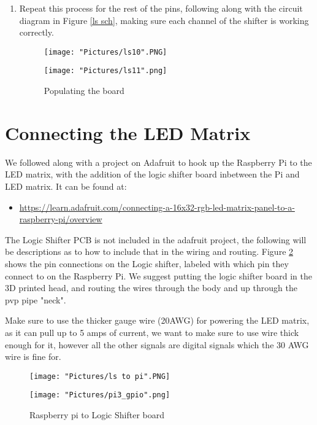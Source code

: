\documentclass[12pt]{article}
\begin{document}
\begin{enumerate}
	\item Repeat this process for the rest of the pins, following along with the circuit diagram in Figure \ref{ls sch}, making sure each channel of the shifter is working correctly. 

\begin{figure}[H]
 	\centering
  	\begin{minipage}[b]{0.45\textwidth}
		\texttt{[image: "Pictures/ls10".PNG]}
  	\end{minipage}
  	\hfill
  	\begin{minipage}[b]{0.45\textwidth}
    		\texttt{[image: "Pictures/ls11".png]}
  	\end{minipage}
	\caption{Populating the board}
	\label{ls2}
\end{figure}

\end{enumerate}

\section{Connecting the LED Matrix}
We followed along with a project on Adafruit to hook up the Raspberry Pi to the LED matrix, with the addition of the logic shifter board inbetween the Pi and LED matrix. It can be found at:

\begin{itemize}
	\item \href{https://learn.adafruit.com/connecting-a-16x32-rgb-led-matrix-panel-to-a-raspberry-pi/overview}{https://learn.adafruit.com/connecting-a-16x32-rgb-led-matrix-panel-to-a-raspberry-pi/overview}
\end{itemize}

\noindent The Logic Shifter PCB is not included in the adafruit project, the following will be descriptions as to how to include that in the wiring and routing. Figure \ref{ls2pi} shows the pin connections on the Logic shifter, labeled with which pin they connect to on the Raspberry Pi. We suggest putting the logic shifter board in the 3D printed head, and routing the wires through the body and up through the pvp pipe "neck". 

\noindent Make sure to use the thicker gauge wire (20AWG) for powering the LED matrix, as it can pull up to 5 amps of current, we want to make sure to use wire thick enough for it, however all the other signals are digital signals which the 30 AWG wire is fine for. 

\begin{figure}[H]
 	\centering
  	\begin{minipage}[b]{0.45\textwidth}
		\texttt{[image: "Pictures/ls to pi".PNG]}
  	\end{minipage}
  	\hfill
  	\begin{minipage}[b]{0.45\textwidth}
    		\texttt{[image: "Pictures/pi3\_gpio".png]}
  	\end{minipage}
	\caption{Raspberry pi to Logic Shifter board}
	\label{ls2pi}
\end{figure}
\end{document}
